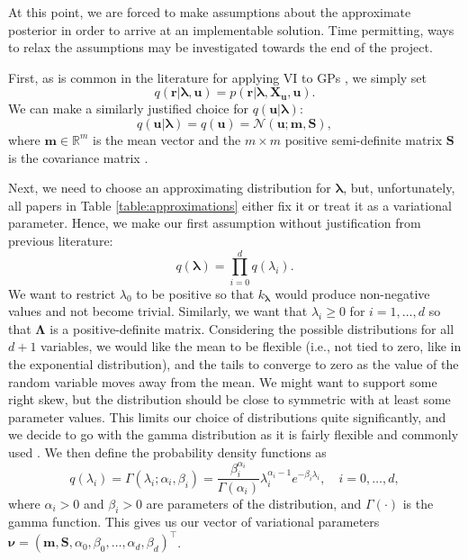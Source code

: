 \documentclass{mprop}
\theoremstyle{definition}
\begin{document}
At this point, we are forced to make assumptions about the approximate posterior
in order to arrive at an implementable solution. Time permitting, ways to relax
the assumptions may be investigated towards the end of the project.

First, as is common in the literature for applying VI to GPs
\cite{DBLP:conf/nips/ChengB17,DBLP:conf/uai/HensmanFL13,DBLP:conf/icml/HoangHL15,DBLP:journals/jmlr/Titsias09},
we simply set
\begin{equation}
  q(\mathbf{r} | \bm\lambda, \mathbf{u}) = p(\mathbf{r} | \bm\lambda, \mathbf{X_u},
  \mathbf{u}).
\end{equation}
We can make a similarly justified choice for $q(\mathbf{u} | \bm\lambda)$:
\begin{equation}
  q(\mathbf{u} | \bm\lambda) = q(\mathbf{u}) = \mathcal{N}(\mathbf{u}; \mathbf{m}, \mathbf{S}),
\end{equation}
where $\mathbf{m} \in \mathbb{R}^{m}$ is the mean vector and the $m \times m$
positive semi-definite matrix $\mathbf{S}$ is the covariance matrix
\cite{DBLP:conf/nips/ChengB17,DBLP:journals/jmlr/HensmanDS17,DBLP:conf/aaai/HoangHL17}.

Next, we need to choose an approximating distribution for $\bm\lambda$, but,
unfortunately, all papers in Table \ref{table:approximations} either fix it or
treat it as a variational parameter. Hence, we make our first assumption without
justification from previous literature:
\begin{equation} \label{eq:theta}
  q(\bm\lambda) = \prod_{i=0}^dq(\lambda_i).
\end{equation}
We want to restrict $\lambda_0$ to be positive so that $k_{\bm\lambda}$ would
produce non-negative values and not become trivial. Similarly, we want that
$\lambda_i \ge 0$ for $i = 1, \dots, d$ so that $\bm\Lambda$ is a
positive-definite matrix. Considering the possible distributions for all $d + 1$
variables, we would like the mean to be flexible (i.e., not tied to zero, like
in the exponential distribution), and the tails to converge to zero as the
value of the random variable moves away from the mean. We might want to support
some right skew, but the distribution should be close to symmetric with at least
some parameter values. This limits our choice of distributions quite
significantly, and we decide to go with the gamma distribution as it is fairly
flexible and commonly used \cite{hogg2018introduction}. We then define the
probability density functions as
\begin{equation} \label{eq:zeta}
  q(\lambda_i) = \Gamma(\lambda_i; \alpha_i, \beta_i) =
  \frac{\beta_i^{\alpha_i}}{\Gamma(\alpha_i)}\lambda_i^{\alpha_i - 1}e^{-\beta_i\lambda_i}, \quad i = 0, \dots, d,
\end{equation}
where $\alpha_i > 0$ and $\beta_i > 0$ are parameters of the distribution, and
$\Gamma(\cdot)$ is the gamma function. This gives us our
vector of variational parameters $\bm\nu = (\mathbf{m}, \mathbf{S}, \alpha_0,
\beta_0, \dots, \alpha_d, \beta_d)^\intercal$.
\end{document}
